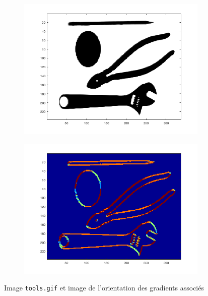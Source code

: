 \documentclass[a4paper]{article}
\begin{document}
\begin{figure}[H]
    \centering
    \begin{subfigure}[c]{0.46\textwidth}
        \centering
        \includegraphics[width=\textwidth]{images/tools.png}
    \end{subfigure}
    \begin{subfigure}[c]{0.46\textwidth}
        \centering
        \includegraphics[width=\textwidth]{images/tools_orientation.png}
    \end{subfigure}
    \caption{Image \texttt{tools.gif} et image de l'orientation des gradients
    associés}
    \label{fig:tools-orientation}
\end{figure}
\end{document}
